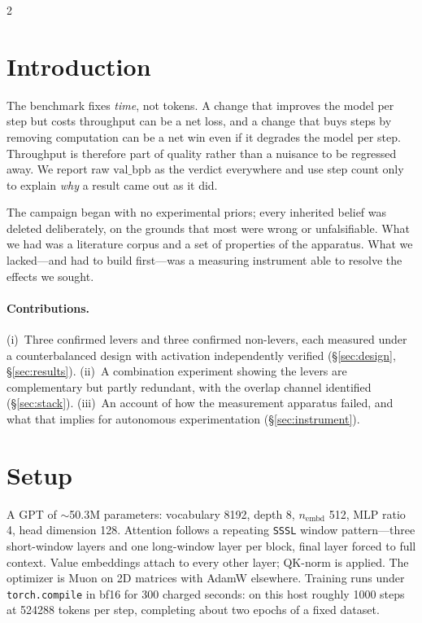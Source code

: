 \documentclass[10pt]{article}
\begin{document}
\begin{multicols}{2}

\section{Introduction}

The benchmark fixes \emph{time}, not tokens. A change that improves the model per step but
costs throughput can be a net loss, and a change that buys steps by removing computation
can be a net win even if it degrades the model per step. Throughput is therefore part of
quality rather than a nuisance to be regressed away. We report raw $\mathrm{val\_bpb}$ as
the verdict everywhere and use step count only to explain \emph{why} a result came out as
it did.

The campaign began with no experimental priors; every inherited belief was deleted
deliberately, on the grounds that most were wrong or unfalsifiable. What we had was a
literature corpus and a set of properties of the apparatus. What we lacked---and had to
build first---was a measuring instrument able to resolve the effects we sought.

\paragraph{Contributions.}
(i)~Three confirmed levers and three confirmed non-levers, each measured under a
counterbalanced design with activation independently verified (\S\ref{sec:design},
\S\ref{sec:results}).
(ii)~A combination experiment showing the levers are complementary but partly redundant,
with the overlap channel identified (\S\ref{sec:stack}).
(iii)~An account of how the measurement apparatus failed, and what that implies for
autonomous experimentation (\S\ref{sec:instrument}).

\section{Setup}

A GPT of $\sim$50.3M parameters: vocabulary 8192, depth 8, $n_{\text{embd}}$ 512, MLP
ratio 4, head dimension 128. Attention follows a repeating \texttt{SSSL} window
pattern---three short-window layers and one long-window layer per block, final layer
forced to full context. Value embeddings attach to every other layer; QK-norm is applied.
The optimizer is Muon on 2D matrices with AdamW elsewhere. Training runs under
\texttt{torch.compile} in bf16 for 300 charged seconds: on this host roughly 1000 steps at
524288 tokens per step, completing about two epochs of a fixed dataset.


\end{multicols}
\end{document}
